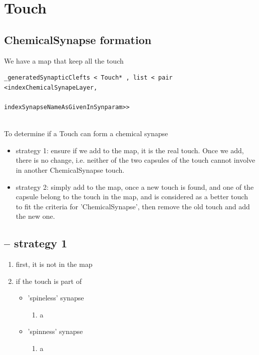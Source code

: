 \section{Touch }


\subsection{ChemicalSynapse formation}

We have a map that keep all the touch 
\begin{verbatim}
_generatedSynapticClefts < Touch* , list < pair <indexChemicalSynapeLayer,
                                                 indexSynapseNameAsGivenInSynparam>>
                                                 
\end{verbatim}



To determine if a Touch can form a chemical synapse
\begin{itemize}
  \item strategy 1: ensure if we add to the map, it is the real touch. Once we
  add, there is no change, i.e. neither of the two capsules of the touch
  cannot involve in another ChemicalSynapse touch.	
  
  \item strategy 2: simply add to the map, once a new touch is found, and one of
  the capsule belong to the touch in the map, and is considered as a better
  touch to fit the criteria for 'ChemicalSynapse', then remove the old touch and
  add the new one.
\end{itemize}

\subsection{-- strategy 1}

\begin{enumerate}
  \item first, it is not in the map
  
  \item if the touch is part of 
  
  \begin{itemize}
    \item 'spineless' synapse

\begin{enumerate}
  \item a
\end{enumerate}


   \item 'spinness' synapse 

\begin{enumerate}
  \item a
\end{enumerate}

  \end{itemize}
  
\end{enumerate}


